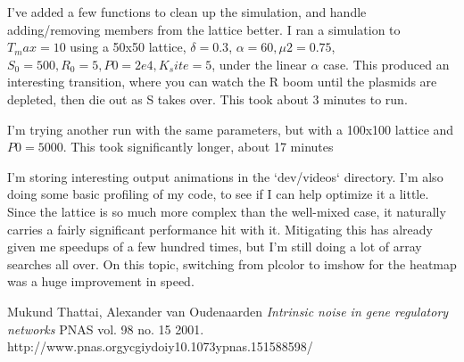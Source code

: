 \documentclass[oneside]{labbook}
\begin{document}
I've added a few functions to clean up the simulation, and handle adding/removing
members from the lattice better. I ran a simulation to $T_max=10$ using a 50x50 lattice,
$\delta=0.3$, $\alpha=60, \mu2 = 0.75$, $S_0 = 500, R_0 = 5, P0 = 2e4, K_site=5$, under the linear
$\alpha$ case. This produced an interesting transition, where you can watch the
R boom until the plasmids are depleted, then die out as S takes over. This
took about 3 minutes to run.

I'm trying another run with the same parameters, but with a 100x100 lattice and $P0=5000$.
This took significantly longer, about 17 minutes

I'm storing interesting output animations in the `dev/videos` directory. I'm
also doing some basic profiling of my code, to see if I can help optimize it a little.
Since the lattice is so much more complex than the well-mixed case, it naturally
carries a fairly significant performance hit with it. Mitigating this has already
given me speedups of a few hundred times, but I'm still doing a lot of array searches
all over. On this topic, switching from plcolor to imshow for the heatmap was
a huge improvement in speed.

\begin{thebibliography}{2}
Mukund Thattai, Alexander van Oudenaarden
\emph{Intrinsic noise in gene regulatory networks}
PNAS vol. 98 no. 15
2001.
http://www.pnas.orgycgiydoiy10.1073ypnas.151588598/
\end{thebibliography}
\end{document}
